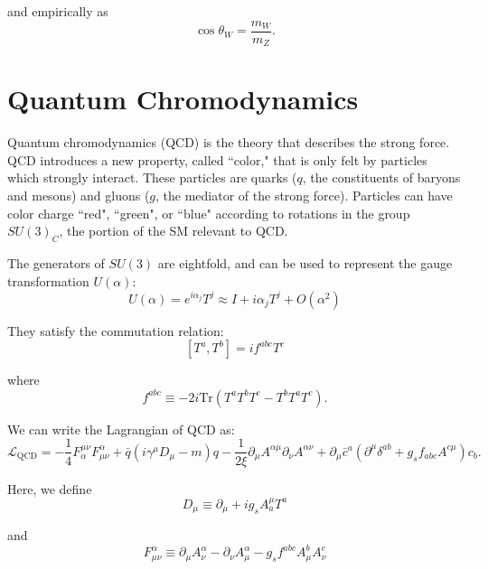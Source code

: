 \noindent and empirically as~\cite{halzen}
\begin{equation}
\cos \theta_{W} = \frac{m_{W}}{m_{Z}}.
\end{equation}

\section{Quantum Chromodynamics}

Quantum chromodynamics (QCD) is the theory that describes the strong force. QCD introduces a new property, called ``color," that is only felt by particles which strongly interact. These particles are quarks ($q$, the constituents of baryons and mesons) and gluons ($g$, the mediator of the strong force). Particles can have color charge ``red", ``green", or ``blue" according to rotations in the group $SU(3)_{C}$, the portion of the SM relevant to QCD.

The generators of $SU(3)$ are eightfold, and can be used to represent the gauge transformation $U(\alpha)$:
\begin{equation}
U(\alpha) = e^{i\alpha_{j}}T^{j} \approx I + i\alpha_{j}T^{j} + O(\alpha^{2})
\end{equation}

\noindent They satisfy the commutation relation:
\begin{equation}
\left[T^{a}, T^{b}\right] = if^{abc}T^{c}
\end{equation}

\noindent where 
\begin{equation}
f^{abc} \equiv -2i\text{Tr}\left(T^{a}T^{b}T^{c} - T^{b}T^{a}T^{c}\right).
\end{equation}

\noindent We can write the Lagrangian of QCD as:\cite{halzen}
\begin{equation}
\mathcal{L}_{\text{QCD}} = -\frac{1}{4}F^{\mu\nu}_{\alpha}F^{\alpha}_{\mu\nu} + \bar{q}\left(i\gamma^{\mu}D_{\mu} - m\right)q - \frac{1}{2\xi}\partial_{\mu}A^{\alpha\mu}\partial_{\nu}A^{\alpha\nu} + \partial_{\mu}\bar{c}^{a}\left(\partial^{\mu}\delta^{ab} + g_{s}f_{abc}A^{c\mu}\right)c_{b}.
\end{equation}

\noindent Here, we define
\begin{equation}
D_{\mu} \equiv \partial_{\mu} + ig_{s}A^{\mu}_{a}T^{a}
\end{equation}

\noindent and
\begin{equation}
F^{\alpha}_{\mu\nu} \equiv \partial_{\mu}A^{\alpha}_{\nu} - \partial_{\nu}A^{\alpha}_{\mu} - g_{s}f^{abc}A^{b}_{\mu}A^{c}_{\nu}
\end{equation}

